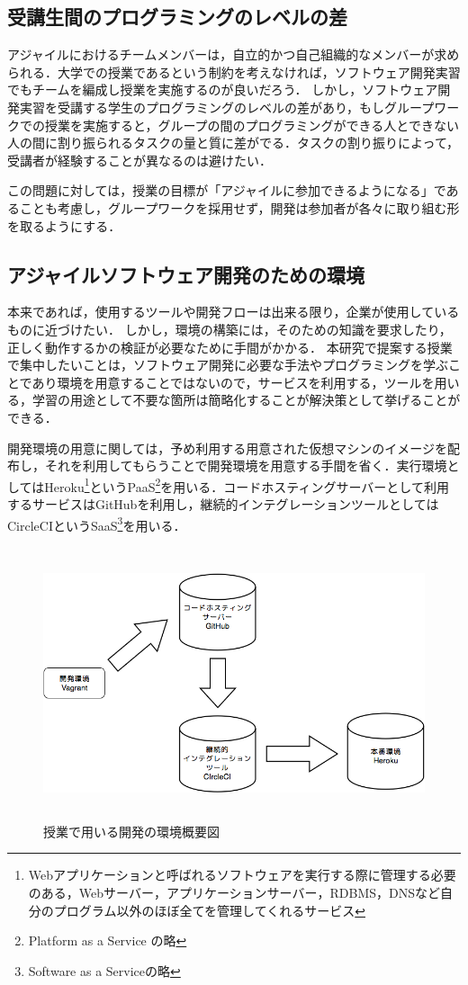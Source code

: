 \subsection{受講生間のプログラミングのレベルの差}

アジャイルにおけるチームメンバーは，自立的かつ自己組織的なメンバーが求められる．大学での授業であるという制約を考えなければ，ソフトウェア開発実習でもチームを編成し授業を実施するのが良いだろう．
しかし，ソフトウェア開発実習を受講する学生のプログラミングのレベルの差があり，もしグループワークでの授業を実施すると，グループの間のプログラミングができる人とできない人の間に割り振られるタスクの量と質に差がでる．タスクの割り振りによって，受講者が経験することが異なるのは避けたい．

この問題に対しては，授業の目標が「アジャイルに参加できるようになる」であることも考慮し，グループワークを採用せず，開発は参加者が各々に取り組む形を取るようにする．

\subsection{アジャイルソフトウェア開発のための環境}

本来であれば，使用するツールや開発フローは出来る限り，企業が使用しているものに近づけたい．
しかし，環境の構築には，そのための知識を要求したり，正しく動作するかの検証が必要なために手間がかかる．
本研究で提案する授業で集中したいことは，ソフトウェア開発に必要な手法やプログラミングを学ぶことであり環境を用意することではないので，サービスを利用する，ツールを用いる，学習の用途として不要な箇所は簡略化することが解決策として挙げることができる．

開発環境の用意に関しては，予め利用する用意された仮想マシンのイメージを配布し，それを利用してもらうことで開発環境を用意する手間を省く．実行環境としてはHeroku\footnote{Webアプリケーションと呼ばれるソフトウェアを実行する際に管理する必要のある，Webサーバー，アプリケーションサーバー，RDBMS，DNSなど自分のプログラム以外のほぼ全てを管理してくれるサービス}というPaaS\footnote{Platform as a Service の略}を用いる．コードホスティングサーバーとして利用するサービスはGitHubを利用し，継続的インテグレーションツールとしてはCircleCIというSaaS\footnote{Software as a Serviceの略}を用いる．


\begin{figure}[H]
\centering
\includegraphics[height=8cm]{./assets/images/class_dev_env.png}
\caption{授業で用いる開発の環境概要図}
\label{fig:class_dev_env}
\end{figure}
